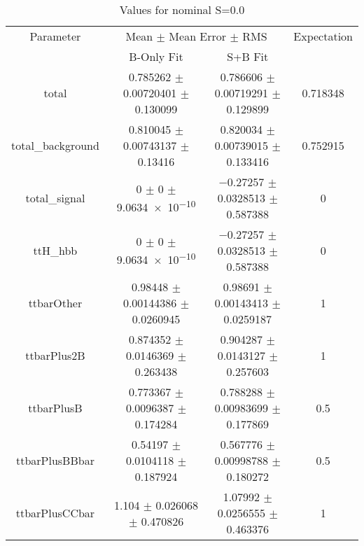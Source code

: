 \begin{table}
\centering
\caption{Values for nominal S=0.0}
\begin{tabular}{cccc}
\toprule
Parameter & \multicolumn{2}{c}{Mean $\pm$ Mean Error $\pm$ RMS} & Expectation\\
 & B-Only Fit & S+B Fit & \\
\midrule
total & \num{0.785262} $\pm$ \num{0.00720401} $\pm$ \num{0.130099} & \num{0.786606} $\pm$ \num{0.00719291} $\pm$ \num{0.129899} & \num{0.718348}\\
total\_background & \num{0.810045} $\pm$ \num{0.00743137} $\pm$ \num{0.13416} & \num{0.820034} $\pm$ \num{0.00739015} $\pm$ \num{0.133416} & \num{0.752915}\\
total\_signal & \num{0} $\pm$ \num{0} $\pm$ \num{9.0634e-10} & \num{-0.27257} $\pm$ \num{0.0328513} $\pm$ \num{0.587388} & \num{0}\\
ttH\_hbb & \num{0} $\pm$ \num{0} $\pm$ \num{9.0634e-10} & \num{-0.27257} $\pm$ \num{0.0328513} $\pm$ \num{0.587388} & \num{0}\\
ttbarOther & \num{0.98448} $\pm$ \num{0.00144386} $\pm$ \num{0.0260945} & \num{0.98691} $\pm$ \num{0.00143413} $\pm$ \num{0.0259187} & \num{1}\\
ttbarPlus2B & \num{0.874352} $\pm$ \num{0.0146369} $\pm$ \num{0.263438} & \num{0.904287} $\pm$ \num{0.0143127} $\pm$ \num{0.257603} & \num{1}\\
ttbarPlusB & \num{0.773367} $\pm$ \num{0.0096387} $\pm$ \num{0.174284} & \num{0.788288} $\pm$ \num{0.00983699} $\pm$ \num{0.177869} & \num{0.5}\\
ttbarPlusBBbar & \num{0.54197} $\pm$ \num{0.0104118} $\pm$ \num{0.187924} & \num{0.567776} $\pm$ \num{0.00998788} $\pm$ \num{0.180272} & \num{0.5}\\
ttbarPlusCCbar & \num{1.104} $\pm$ \num{0.026068} $\pm$ \num{0.470826} & \num{1.07992} $\pm$ \num{0.0256555} $\pm$ \num{0.463376} & \num{1}\\
\bottomrule
\end{tabular}
\end{table}